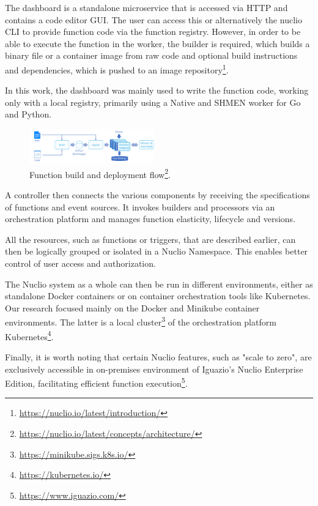 The dashboard is a standalone microservice that is accessed via HTTP and contains a code editor GUI. The user can access this or alternatively the nuclio CLI to provide function code via the function registry. However, in order to be able to execute the function in the worker, the builder is required, which builds a binary file or a container image from raw code and optional build instructions and dependencies, which is pushed to an image repository\footnote{\url{https://nuclio.io/latest/introduction/}}.

In this work, the dashboard was mainly used to write the function code, working only with a local registry, primarily using a Native and SHMEN worker for Go and Python. 

\begin{figure}
    \centering
    \includegraphics[width=0.48\textwidth]{figures/profaastinate/nuclio-build-deploy.png} 
    \caption{
         Function build and deployment flow\protect\footnote{\url{https://nuclio.io/latest/concepts/architecture/}}.
    }
    \label{fig:nuclio-build-deploy}
\end{figure}

A controller then connects the various components by receiving the specifications of functions and event sources. It invokes builders and processors via an orchestration platform and manages function elasticity, lifecycle and versions.

\label{sec:nuclio-namespace}
All the resources, such as functions or triggers, that are described earlier, can then be logically grouped or isolated in a Nuclio Namespace. This enables better control of user access and authorization. 

The Nuclio system as a whole can then be run in different environments, either as standalone Docker containers or on container orchestration tools like Kubernetes. Our research focused mainly on the Docker and Minikube container environments. The latter is a local cluster\footnote{\url{https://minikube.sigs.k8s.io/}} of the orchestration platform Kubernetes\footnote{\url{https://kubernetes.io/}}. 

Finally, it is worth noting that certain Nuclio features, such as "scale to zero", are exclusively accessible in on-premises environment of Iguazio's Nuclio Enterprise Edition, facilitating efficient function execution\footnote{\url{https://www.iguazio.com/}}.
